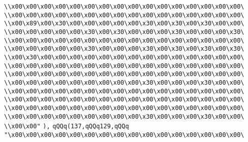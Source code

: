 \verb|\\x00\x00\x00\x00\x00\x00\x00\x00\x00\x00\x00\x00\x00\x00\x00\x00\|\newline
\verb|\\x00\x00\x00\x00\x00\x00\x00\x00\x00\x00\x00\x00\x00\x00\x00\x00\|\newline
\verb|\\x00\x89\x00\x30\x00\x00\x00\x00\x00\x30\x00\x30\x00\x30\x00\x00\|\newline
\verb|\\x00\x00\x00\x00\x00\x30\x00\x30\x00\x00\x00\x30\x00\x00\x00\x30\|\newline
\verb|\\x00\x00\x00\x00\x00\x00\x00\x00\x00\x00\x00\x00\x00\x00\x00\x00\|\newline
\verb|\\x00\x00\x00\x00\x00\x30\x00\x00\x00\x30\x00\x30\x00\x30\x00\x30\|\newline
\verb|\\x00\x30\x00\x00\x00\x00\x00\x00\x00\x00\x00\x00\x00\x00\x00\x00\|\newline
\verb|\\x00\x00\x00\x00\x00\x00\x00\x00\x00\x00\x00\x00\x00\x00\x00\x00\|\newline
\verb|\\x00\x00\x00\x00\x00\x00\x00\x00\x00\x00\x00\x00\x00\x00\x00\x00\|\newline
\verb|\\x00\x00\x00\x00\x00\x00\x00\x00\x00\x30\x00\x00\x00\x30\x00\x00\|\newline
\verb|\\x00\x00\x00\x00\x00\x00\x00\x00\x00\x00\x00\x00\x00\x00\x00\x00\|\newline
\verb|\\x00\x00\x00\x00\x00\x00\x00\x00\x00\x00\x00\x00\x00\x00\x00\x00\|\newline
\verb|\\x00\x00\x00\x00\x00\x00\x00\x00\x00\x00\x00\x00\x00\x00\x00\x00\|\newline
\verb|\\x00\x00\x00\x00\x00\x00\x00\x00\x00\x30\x00\x00\x00\x30\x00\x00\|\newline
\verb|\\x00\x00"|\newline
\verb|),|\newline
\verb|qQQq(137,qQQq129,qQQq|\newline
\verb|"\x00\x00\x00\x00\x00\x00\x00\x00\x00\x00\x00\x00\x00\x00\x00\x00\|\newline
